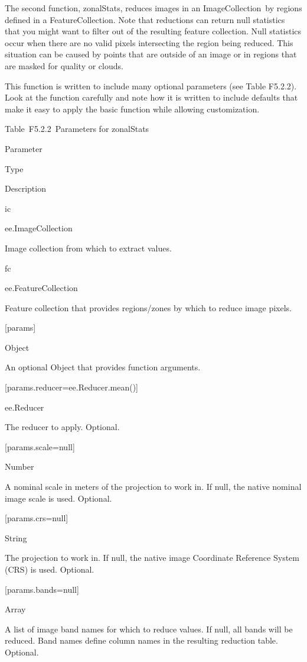\documentclass[
  letterpaper,
  DIV=11,
  numbers=noendperiod]{scrreprt}
\begin{document}
The second function, zonalStats, reduces images in an ImageCollection~by
regions defined in a FeatureCollection. Note that reductions can return
null statistics that you might want to filter out of the resulting
feature collection. Null statistics occur when there are no valid pixels
intersecting the region being reduced. This situation can be caused by
points that are outside of an image or in regions that are masked for
quality or clouds.

This function is written to include many optional parameters (see Table
F5.2.2). Look at the function carefully and note how it is written to
include defaults that make it easy to apply the basic function while
allowing customization.

Table~F5.2.2~Parameters for zonalStats

Parameter

Type

Description

ic

ee.ImageCollection

Image collection from which to extract values.

fc

ee.FeatureCollection

Feature collection that provides regions/zones by which to reduce image
pixels.

{[}params{]}

Object

An optional Object that provides function arguments.

{[}params.reducer=ee.Reducer.mean(){]}

ee.Reducer

The reducer to apply. Optional.

{[}params.scale=null{]}

Number

A nominal scale in meters of the projection to work in. If null, the
native nominal image scale is used. Optional.

{[}params.crs=null{]}

String

The projection to work in. If null, the native image Coordinate
Reference System (CRS) is used. Optional.

{[}params.bands=null{]}

Array

A list of image band names for which to reduce values. If null, all
bands will be reduced. Band names define column names in the resulting
reduction table. Optional.
\end{document}
